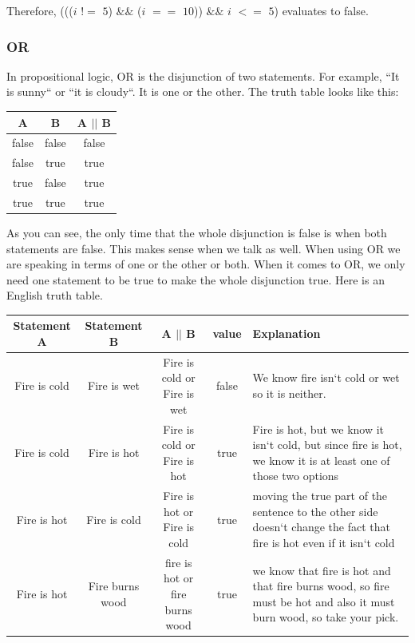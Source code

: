 \documentclass[11]{article}
\begin{document}
 Therefore, ((($i$ $!=$ $5$) $\&\&$ ($i$ $==$ $10$)) $\&\&$ $i$ $<=$ $5$) evaluates to false.
 
 \subsubsection{OR}
 In propositional logic, OR is the disjunction of two statements. For example, ``It is sunny`` or ``it is cloudy``. It is one or the other. The truth table looks like this:\\
 
 \begin{center}
  \begin{tabular}{ | c | c | c |}
    \hline
    A & B & A $||$ B \\ \hline
    false & false & false \\ \hline
    false & true & true \\ \hline
    true & false & true \\ \hline
    true & true & true \\
    \hline
  \end{tabular}
\end{center}

As you can see, the only time that the whole disjunction is false is when both statements are false. This makes sense when we talk as well. When using OR we are speaking in terms of one or the other or both. When it comes to OR, we only need one statement to be true to make the whole disjunction true. Here is an English truth table.

\begin{center}
  \begin{tabular}{ | c | c | c | c | p{4.5cm} |}
    \hline
		Statement A & Statement B & A $||$ B & value & Explanation \\ \hline
		Fire is cold & Fire is wet & Fire is cold or Fire is wet & false & We know fire isn`t cold or wet so it is neither. \\  \hline
		
		Fire is cold & Fire is hot & Fire is cold or Fire is hot & true & Fire is hot, but we know it isn`t cold, but since fire is hot, we know it is at least one of those two options \\ \hline
		
		Fire is hot & Fire is cold & Fire is hot or Fire is cold & true & moving the true part of the sentence to the other side doesn`t change the fact that fire is hot even if it isn`t cold \\ \hline
		
		Fire is hot & Fire burns wood & fire is hot or fire burns wood & true & we know that fire is hot and that fire burns wood, so fire must be hot and also it must burn wood, so take your pick. \\
    \hline
  \end{tabular}
\end{center}
\end{document}
